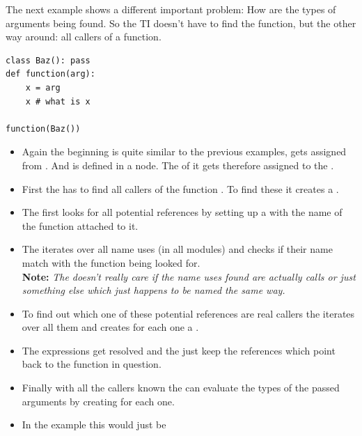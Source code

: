 \documentclass[12pt,halfparskip,DIV11,BCOR10mm]{scrreprt}
\begin{document}
The next example shows a different important problem: How are the types of arguments being found. So the TI doesn't have to find the function, but the other way around: all callers of a function.

\begin{lstlisting}
class Baz(): pass
def function(arg):
	x = arg
	x # what is x
	
function(Baz())
\end{lstlisting}

\begin{itemize}
	\item Again the beginning is quite similar to the previous examples,  gets assigned from . And  is defined in a  node. The  of it gets therefore assigned to the .
	\item First the  has to find all callers of the function . To find these it creates a .
	\item The  first looks for all potential references by setting up a  with the name of the function attached to it.
	\item The  iterates over all name uses (in all modules) and checks if their name match with the function being looked for. \textbf{} \\\textbf{Note:} \emph{The  doesn't really care if the name uses found are actually calls or just something else which just happens to be named the same way.}
	\item To find out which one of these potential references are real callers the   iterates over all them and creates for each one a . 
	\item The expressions get resolved and the  just keep the references which point back to the function in question.
	\item Finally with all the callers known the  can evaluate the types of the passed arguments by creating  for each one.
	\item[] In the example this would just be 

\end{itemize}
\end{document}
